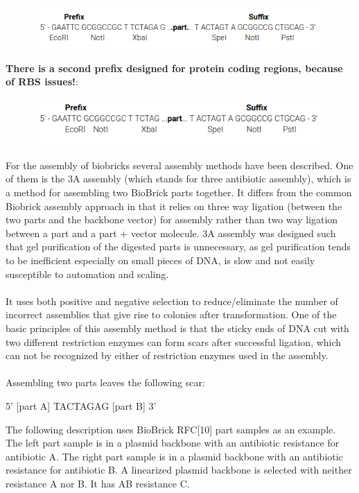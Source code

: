 \begin{figure}[!htbp]
    \centering
    \includegraphics[width=\textwidth]{images/chap4/chap4_bio_01.png}
    \label{fig:ch4bio01}
\end{figure}
\FloatBarrier

\noindent\textbf{There is a second prefix designed for protein coding regions, because of RBS issues!}:

\begin{figure}[!htbp]
    \centering
    \includegraphics[width=\textwidth]{images/chap4/chap4_bio_02.png}
    \label{fig:ch4bio02}
\end{figure}
\FloatBarrier
\noindent
For the assembly of biobricks several assembly methods have been described. One of them is the 3A assembly (which stands for three antibiotic assembly), which is a method for assembling two BioBrick parts together. It differs from the common Biobrick assembly approach in that it relies on three way ligation (between the two parts and the backbone vector) for assembly rather than two way ligation between a part and a part + vector molecule.
3A assembly was designed such that gel purification of the digested parts is unnecessary,
as gel purification tends to be inefficient especially on small pieces of DNA, is slow and not easily susceptible to automation and scaling.\\ \\
It uses both positive and negative selection to reduce/eliminate the number of incorrect assemblies that give rise to colonies after transformation. One of the basic principles of this assembly method is that the sticky ends of DNA cut with two different restriction enzymes can form scars after successful ligation, which can not be recognized by either of restriction enzymes used in the assembly.\\ \\
Assembling two parts leaves the following scar: 
\begin{center}
5' [part A] TACTAGAG [part B] 3'     
\end{center}
The following description uses BioBrick RFC[10] part samples as an example.
The left part sample is in a plasmid backbone with an antibiotic resistance for antibiotic A.
The right part sample is in a plasmid backbone with an antibiotic resistance for antibiotic B.
A linearized plasmid backbone is selected with neither resistance A nor B. It has AB resistance C. 


